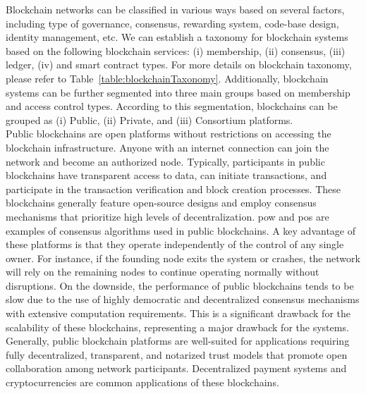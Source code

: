 \documentclass[conference]{IEEEtran}
\begin{document}
%
Blockchain networks can be classified in various ways based on several factors, including type of governance, consensus, rewarding system, code-base design, identity management, etc. We can establish a taxonomy for blockchain systems based on the following blockchain services: (i) membership, (ii) consensus, (iii) ledger, (iv) and smart contract types. For more details on blockchain taxonomy, please refer to Table~\ref{table:blockchainTaxonomy}. Additionally, blockchain systems can be further segmented into three main groups based on membership and access control types. According to this segmentation, blockchains can be grouped as (i) Public, (ii) Private, and (iii) Consortium platforms. \\

Public blockchains are open platforms without restrictions on accessing the blockchain infrastructure. Anyone with an internet connection can join the network and become an authorized node. Typically, participants in public blockchains have transparent access to data, can initiate transactions, and participate in the transaction verification and block creation processes. These blockchains generally feature open-source designs and employ consensus mechanisms that prioritize high levels of decentralization. \ac{pow} and \ac{pos} are examples of consensus algorithms used in public blockchains. A key advantage of these platforms is that they operate independently of the control of any single owner. For instance, if the founding node exits the system or crashes, the network will rely on the remaining nodes to continue operating normally without disruptions. On the downside, the performance of public blockchains tends to be slow due to the use of highly democratic and decentralized consensus mechanisms with extensive computation requirements. This is a significant drawback for the scalability of these blockchains, representing a major drawback for the systems. Generally, public blockchain platforms are well-suited for applications requiring fully decentralized, transparent, and notarized trust models that promote open collaboration among network participants. Decentralized payment systems and cryptocurrencies are common applications of these blockchains. \\
\end{document}
